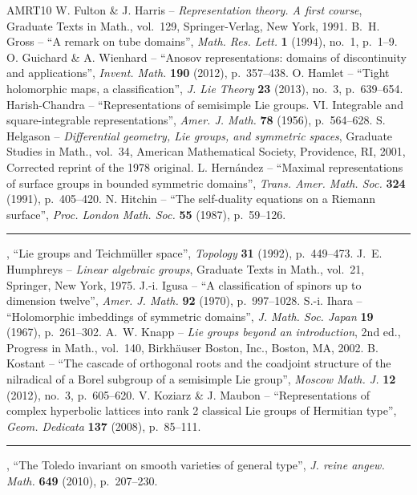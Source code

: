 \begin{thebibliography}{AMRT10}
 W. Fulton \& J. Harris -- \emph{Representation theory. A first course}, Graduate Texts in Math., vol.~129, Springer-Verlag, New York, 1991.
 B.~H. Gross -- ``A remark on tube domains'', \emph{Math. Res. Lett.} \textbf{1} (1994), no.~1, p.~1--9.
 O. Guichard \& A. Wienhard -- ``Anosov representations: domains of discontinuity and applications'', \emph{Invent. Math.} \textbf{190} (2012), p.~357--438.
 O. Hamlet -- ``Tight holomorphic maps, a classification'', \emph{J. Lie Theory} \textbf{23} (2013), no.~3, p.~639--654.
 Harish-Chandra -- ``Representations of semisimple Lie groups. VI. Integrable and square-integrable representations'', \emph{Amer. J. Math.} \textbf{78} (1956), p.~564--628.
 S. Helgason -- \emph{Differential geometry, Lie groups, and symmetric spaces}, Graduate Studies in Math., vol.~34, American Mathematical Society, Providence, RI, 2001, Corrected reprint of the 1978 original.
 L. Hernández -- ``Maximal representations of surface groups in bounded symmetric domains'', \emph{Trans. Amer. Math. Soc.} \textbf{324} (1991), p.~405--420.
 N. Hitchin -- ``The self-duality equations on a Riemann surface'', \emph{Proc. London Math. Soc.} \textbf{55} (1987), p.~59--126.
 \rule{1.2em}{.1pt}, ``Lie groups and Teichmüller space'', \emph{Topology} \textbf{31} (1992), p.~449--473.
 J.~E. Humphreys -- \emph{Linear algebraic groups}, Graduate Texts in Math., vol.~21, Springer, New York, 1975.
 J.-i. Igusa -- ``A classification of spinors up to dimension twelve'', \emph{Amer. J. Math.} \textbf{92} (1970), p.~997--1028.
 S.-i. Ihara -- ``Holomorphic imbeddings of symmetric domains'', \emph{J. Math. Soc. Japan} \textbf{19} (1967), p.~261--302.
 A.~W. Knapp -- \emph{Lie groups beyond an introduction}, 2nd ed., Progress in Math., vol.~140, Birkhäuser Boston, Inc., Boston, MA, 2002.
 B. Kostant -- ``The cascade of orthogonal roots and the coadjoint structure of the nilradical of a Borel subgroup of a semisimple Lie group'', \emph{Moscow Math. J.} \textbf{12} (2012), no.~3, p.~605--620.
 V. Koziarz \& J. Maubon -- ``Representations of complex hyperbolic lattices into rank 2 classical Lie groups of Hermitian type'', \emph{Geom. Dedicata} \textbf{137} (2008), p.~85--111.
 \rule{1.2em}{.1pt}, ``The Toledo invariant on smooth varieties of general type'', \emph{J. reine angew. Math.} \textbf{649} (2010), p.~207--230.

\end{thebibliography}
